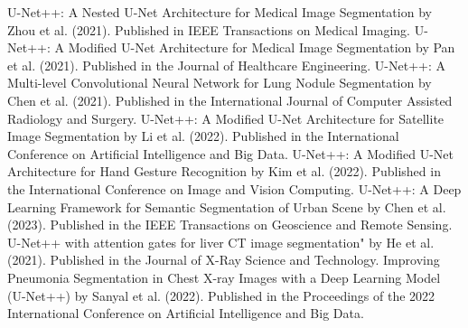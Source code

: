 \documentclass[conference]{IEEEtran}
\begin{document}
\begin{thebibliography}{00}
 U-Net++: A Nested U-Net Architecture for Medical Image Segmentation by Zhou et al. (2021). Published in IEEE Transactions on Medical Imaging.
 U-Net++: A Modified U-Net Architecture for Medical Image Segmentation by Pan et al. (2021). Published in the Journal of Healthcare Engineering.
 U-Net++: A Multi-level Convolutional Neural Network for Lung Nodule Segmentation by Chen et al. (2021). Published in the International Journal of Computer Assisted Radiology and Surgery.
 U-Net++: A Modified U-Net Architecture for Satellite Image Segmentation by Li et al. (2022). Published in the International Conference on Artificial Intelligence and Big Data.
 U-Net++: A Modified U-Net Architecture for Hand Gesture Recognition by Kim et al. (2022). Published in the International Conference on Image and Vision Computing.
 U-Net++: A Deep Learning Framework for Semantic Segmentation of Urban Scene by Chen et al. (2023). Published in the IEEE Transactions on Geoscience and Remote Sensing.
 U-Net++ with attention gates for liver CT image segmentation" by He et al. (2021). Published in the Journal of X-Ray Science and Technology.
 Improving Pneumonia Segmentation in Chest X-ray Images with a Deep Learning Model (U-Net++) by Sanyal et al. (2022). Published in the Proceedings of the 2022 International Conference on Artificial Intelligence and Big Data.
\end{thebibliography}
\end{document}
